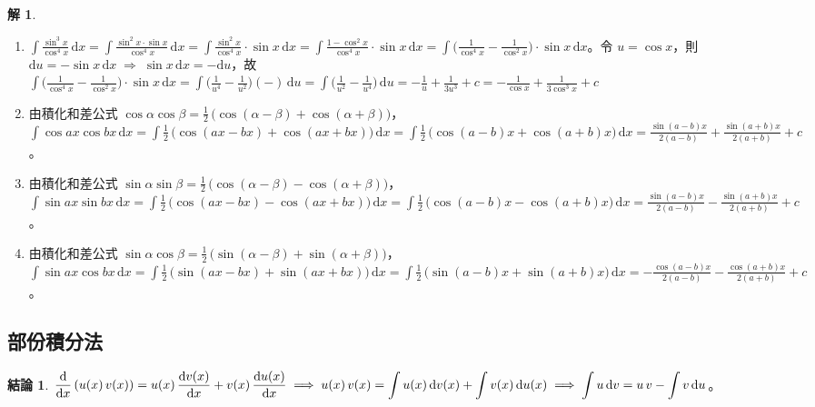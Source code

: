 \documentclass[12pt]{extarticle}
\newcommand{\ds}{\displaystyle}
\newcommand{\ie}{\;\Longrightarrow\;}
\theoremstyle{definition}
\newtheorem*{fact}{結論}
\newtheorem*{sol}{解}
\newcommand{\myline}{\noindent\makebox[\linewidth]{\rule{\paperwidth}{0.4pt}}}
\begin{document}
\begin{sol}
\begin{enumerate}
    \item $\ds\int\frac{\sin^3 x}{\cos^4 x}\,\mathrm{d}x = \int\frac{\sin^2x\cdot\sin x}{\cos^4 x}\,\text{d}x = \int\frac{\sin^2x}{\cos^4 x}\cdot\sin x\,\text{d}x = \int\frac{1 - \cos^2 x}{\cos^4 x}\cdot\sin x\,\text{d}x = \int\big(\frac{1}{\cos^4 x} - \frac{1}{\cos^2 x}\big)\cdot\sin x\,\text{d}x$。令 $\ds u = \cos x$，則 $\ds\text{d}u = -\sin x\,\text{d}x\ie\sin x\,\text{d}x = -\text{d}u$，故 $\ds\int\big(\frac{1}{\cos^4 x} - \frac{1}{\cos^2 x}\big)\cdot\sin x\,\text{d}x = \int\big(\frac{1}{u^4} - \frac{1}{u^2}\big)(-)\,\text{d}u = \int\big(\frac{1}{u^2} - \frac{1}{u^4}\big)\,\text{d}u = -\frac{1}{u} + \frac{1}{3u^3} + c = -\frac{1}{\cos x} + \frac{1}{3\cos^3 x} + c$
    \item 由積化和差公式 $\ds\cos\alpha\cos\beta = \frac{1}{2}\,\big(\cos(\alpha - \beta) + \cos(\alpha + \beta)\big)$，$\ds\int\cos ax\cos bx\,\text{d}x = \int\frac{1}{2}\,\big(\cos(ax - bx) + \cos(ax + bx)\big)\,\text{d}x = \int\frac{1}{2}\,\big(\cos(a - b)x + \cos(a + b)x\big)\,\text{d}x = \frac{\sin{(a-b)x}}{2(a-b)} + \frac{\sin{(a+b)x}}{2(a+b)}+ c$。
    \item 由積化和差公式 $\ds\sin\alpha\sin\beta = \frac{1}{2}\,\big(\cos(\alpha - \beta) - \cos(\alpha + \beta)\big)$，$\ds\int\sin ax\sin bx\,\text{d}x = \int\frac{1}{2}\,\big(\cos(ax - bx) - \cos(ax + bx)\big)\,\text{d}x = \int\frac{1}{2}\,\big(\cos(a - b)x - \cos(a + b)x\big)\,\text{d}x = \frac{\sin{(a-b)x}}{2(a-b)} - \frac{\sin{(a+b)x}}{2(a+b)}+ c$。
    \item 由積化和差公式 $\ds\sin\alpha\cos\beta = \frac{1}{2}\,\big(\sin(\alpha - \beta) + \sin(\alpha + \beta)\big)$，$\ds\int\sin ax\cos bx\,\text{d}x = \int\frac{1}{2}\,\big(\sin(ax - bx) + \sin(ax + bx)\big)\,\text{d}x = \int\frac{1}{2}\,\big(\sin(a - b)x + \sin(a + b)x\big)\,\text{d}x = -\frac{\cos{(a-b)x}}{2(a-b)} - \frac{\cos{(a+b)x}}{2(a+b)}+ c$。
  \end{enumerate}
\end{sol}

\myline

\subsection*{部份積分法}

\begin{fact}
  $\ds\frac{\mathrm{d}}{\mathrm{d}x}\,(u(x)\,v(x)) = u(x)\,\frac{\mathrm{d}v(x)}{\mathrm{d}x} + v(x)\,\frac{\mathrm{d}u(x)}{\mathrm{d}x}\ie u(x)\,v(x) = \int u(x)\,\mathrm{d}v(x) + \int v(x)\,\mathrm{d}u(x) \\ \ie \int u\,\text{d}v = u\,v - \int v\,\text{d}u$。
\end{fact}
\end{document}
